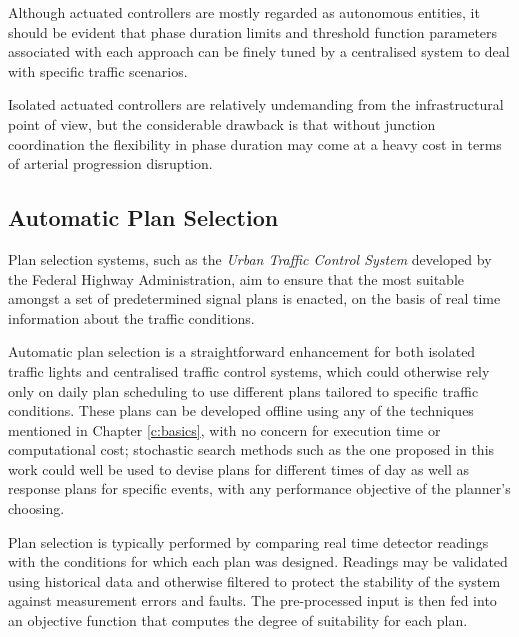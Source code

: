 
Although actuated controllers are mostly regarded as autonomous entities, it should be evident that phase duration limits and threshold function parameters associated with each approach can be finely tuned by a centralised system to deal with specific traffic scenarios.

Isolated actuated controllers are relatively undemanding from the infrastructural point of view, but the considerable drawback is that without junction coordination the flexibility in phase duration may come at a heavy cost in terms of arterial progression disruption.


\subsection{Automatic Plan Selection}
Plan selection systems, such as the \emph{Urban Traffic Control System} developed by the Federal Highway Administration, aim to ensure that the most suitable amongst a set of predetermined signal plans is enacted, on the basis of real time information about the traffic conditions.

Automatic plan selection is a straightforward enhancement for both isolated traffic lights and centralised traffic control systems, which could otherwise rely only on daily plan scheduling to use different plans tailored to specific traffic conditions. These plans can be developed offline using any of the techniques mentioned in Chapter \ref{c:basics}, with no concern for execution time or computational cost; stochastic search methods such as the one proposed in this work could well be used to devise plans for different times of day as well as response plans for specific events, with any performance objective of the planner's choosing.

Plan selection is typically performed by comparing real time detector readings with the conditions for which each plan was designed. Readings may be validated using historical data and otherwise filtered to protect the stability of the system against measurement errors and faults. The pre-processed input is then fed into an objective function that computes the degree of suitability for each plan.

